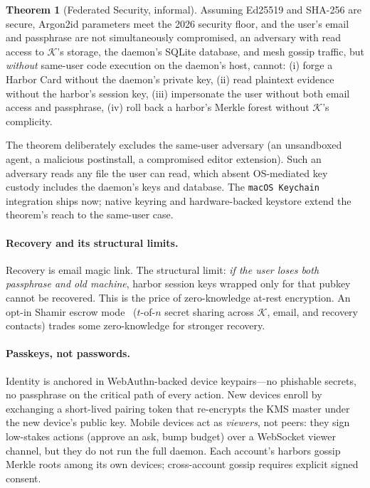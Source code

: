 \documentclass[11pt,a4paper]{article}
\theoremstyle{definition}
\newtheorem{theorem}{Theorem}[section]
\theoremstyle{remark}
\begin{document}
\begin{theorem}[Federated Security, informal]\label{thm:federated-security}
Assuming Ed25519 and SHA-256 are secure, Argon2id parameters meet the 2026 security floor, and the user's email and passphrase are not simultaneously compromised, an adversary with read access to $\mathcal{K}$'s storage, the daemon's SQLite database, and mesh gossip traffic, but \emph{without} same-user code execution on the daemon's host, cannot:
(i) forge a Harbor Card without the daemon's private key,
(ii) read plaintext evidence without the harbor's session key,
(iii) impersonate the user without both email access and passphrase,
(iv) roll back a harbor's Merkle forest without $\mathcal{K}$'s complicity.
\end{theorem}

The theorem deliberately excludes the same-user adversary (an unsandboxed agent, a malicious postinstall, a compromised editor extension). Such an adversary reads any file the user can read, which absent OS-mediated key custody includes the daemon's keys and database. The \texttt{macOS Keychain} integration ships now; native keyring and hardware-backed keystore extend the theorem's reach to the same-user case.

\paragraph{Recovery and its structural limits.} Recovery is email magic link. The structural limit: \emph{if the user loses both passphrase and old machine}, harbor session keys wrapped only for that pubkey cannot be recovered. This is the price of zero-knowledge at-rest encryption. An opt-in Shamir escrow mode~\cite{shamir1979share} ($t$-of-$n$ secret sharing across $\mathcal{K}$, email, and recovery contacts) trades some zero-knowledge for stronger recovery.

\paragraph{Passkeys, not passwords.} Identity is anchored in WebAuthn-backed device keypairs---no phishable secrets, no passphrase on the critical path of every action. New devices enroll by exchanging a short-lived pairing token that re-encrypts the KMS master under the new device's public key. Mobile devices act as \emph{viewers}, not peers: they sign low-stakes actions (approve an ask, bump budget) over a WebSocket viewer channel, but they do not run the full daemon. Each account's harbors gossip Merkle roots among its own devices; cross-account gossip requires explicit signed consent.
\end{document}
